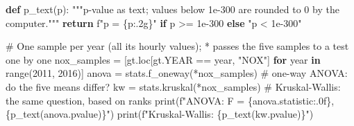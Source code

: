 \documentclass[
  letterpaper,
  DIV=11,
  numbers=noendperiod]{scrreprt}
\newenvironment{Shaded}{\begin{snugshade}}{\end{snugshade}}
\newcommand{\BuiltInTok}[1]{\textcolor[rgb]{0.00,0.23,0.31}{#1}}
\newcommand{\CommentTok}[1]{\textcolor[rgb]{0.37,0.37,0.37}{#1}}
\newcommand{\ControlFlowTok}[1]{\textcolor[rgb]{0.00,0.23,0.31}{\textbf{#1}}}
\newcommand{\DecValTok}[1]{\textcolor[rgb]{0.68,0.00,0.00}{#1}}
\newcommand{\FloatTok}[1]{\textcolor[rgb]{0.68,0.00,0.00}{#1}}
\newcommand{\KeywordTok}[1]{\textcolor[rgb]{0.00,0.23,0.31}{\textbf{#1}}}
\newcommand{\NormalTok}[1]{\textcolor[rgb]{0.00,0.23,0.31}{#1}}
\newcommand{\OperatorTok}[1]{\textcolor[rgb]{0.37,0.37,0.37}{#1}}
\newcommand{\SpecialCharTok}[1]{\textcolor[rgb]{0.37,0.37,0.37}{#1}}
\newcommand{\SpecialStringTok}[1]{\textcolor[rgb]{0.13,0.47,0.30}{#1}}
\newcommand{\StringTok}[1]{\textcolor[rgb]{0.13,0.47,0.30}{#1}}
\begin{document}
\begin{Shaded}
\begin{Highlighting}[]
\KeywordTok{def}\NormalTok{ p\_text(p):}
    \CommentTok{"""p{-}value as text; values below 1e{-}300 are rounded to 0 by the computer."""}
    \ControlFlowTok{return} \SpecialStringTok{f"p = }\SpecialCharTok{\{}\NormalTok{p}\SpecialCharTok{:.2g\}}\SpecialStringTok{"} \ControlFlowTok{if}\NormalTok{ p }\OperatorTok{\textgreater{}=} \FloatTok{1e{-}300} \ControlFlowTok{else} \StringTok{"p \textless{} 1e{-}300"}

\CommentTok{\# One sample per year (all its hourly values); * passes the five samples to a test one by one}
\NormalTok{nox\_samples }\OperatorTok{=}\NormalTok{ [gt.loc[gt.YEAR }\OperatorTok{==}\NormalTok{ year, }\StringTok{"NOX"}\NormalTok{] }\ControlFlowTok{for}\NormalTok{ year }\KeywordTok{in} \BuiltInTok{range}\NormalTok{(}\DecValTok{2011}\NormalTok{, }\DecValTok{2016}\NormalTok{)]}
\NormalTok{anova }\OperatorTok{=}\NormalTok{ stats.f\_oneway(}\OperatorTok{*}\NormalTok{nox\_samples)                       }\CommentTok{\# one{-}way ANOVA: do the five means differ?}
\NormalTok{kw }\OperatorTok{=}\NormalTok{ stats.kruskal(}\OperatorTok{*}\NormalTok{nox\_samples)                           }\CommentTok{\# Kruskal{-}Wallis: the same question, based on ranks}
\BuiltInTok{print}\NormalTok{(}\SpecialStringTok{f"ANOVA:          F = }\SpecialCharTok{\{}\NormalTok{anova}\SpecialCharTok{.}\NormalTok{statistic}\SpecialCharTok{:.0f\}}\SpecialStringTok{, }\SpecialCharTok{\{}\NormalTok{p\_text(anova.pvalue)}\SpecialCharTok{\}}\SpecialStringTok{"}\NormalTok{)}
\BuiltInTok{print}\NormalTok{(}\SpecialStringTok{f"Kruskal{-}Wallis: }\SpecialCharTok{\{}\NormalTok{p\_text(kw.pvalue)}\SpecialCharTok{\}}\SpecialStringTok{"}\NormalTok{)}


\end{Highlighting}
\end{Shaded}
\end{document}
